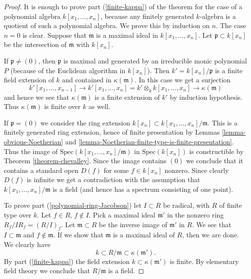 \begin{proof}
It is enough to prove part (\ref{finite-kappa}) of
the theorem for the case of a polynomial
algebra $k[x_1, \ldots, x_n]$, because any finitely generated
$k$-algebra is a quotient of such a polynomial algebra.
We prove this by induction on $n$. The case $n = 0$ is clear.
Suppose that $\mathfrak m$ is a maximal ideal in $k[x_1, \ldots, x_n]$.
Let $\mathfrak p \subset k[x_n]$ be the intersection
of $\mathfrak m$ with $k[x_n]$.

\medskip\noindent
If $\mathfrak p \not = (0)$,
then $\mathfrak p$ is maximal and generated by an irreducible
monic polynomial $P$ (because of the Euclidean algorithm
in $k[x_n]$). Then
$k' = k[x_n]/\mathfrak p$ is a finite field extension of $k$
and contained in $\kappa(\mathfrak m)$. In this case
we get a surjection
$$
k'[x_1, \ldots, x_{n-1}] 
\to
k'[x_1,\ldots,x_n] =
k' \otimes_k k[x_1,\ldots, x_n]
\longrightarrow
\kappa(\mathfrak m)
$$
and hence we see that $\kappa(\mathfrak m)$ is a finite
extension  of $k'$ by induction hypothesis. Thus $\kappa(\mathfrak m)$
is finite over $k$ as well.

\medskip\noindent
If $\mathfrak p = (0)$ we consider the ring
extension $k[x_n] \subset k[x_1, \ldots, x_n]/\mathfrak m$.
This is a finitely generated ring extension, hence
of finite presentation by
Lemmas \ref{lemma-obvious-Noetherian} and
\ref{lemma-Noetherian-finite-type-is-finite-presentation}.
Thus the image of $\text{Spec}(k[x_1, \ldots, x_n]/\mathfrak m)$
in $\text{Spec}(k[x_n])$ is constructible by
Theorem \ref{theorem-chevalley}. Since the image
contains $(0)$ we conclude that it contains a standard
open $D(f)$ for some $f\in k[x_n]$ nonzero. Since clearly
$D(f)$ is infinite we get a contradiction with the
assumption that $k[x_1,\ldots,x_n]/\mathfrak m$ is
a field (and hence has a spectrum consisting of one point).

\medskip\noindent
To prove part (\ref{polynomial-ring-Jacobson}) let
$I \subset R$ be radical, with $R$ of finite type over $k$.
Let $f \in R$, $f \not \in I$. Pick a maximal ideal $\mathfrak m'$
in the nonzero ring $R_f/IR_f = (R/I)_f$. Let $\mathfrak m \subset R$
be the inverse image of $\mathfrak m'$ in $R$. We see that
$I \subset \mathfrak m$
and $f \not \in \mathfrak m$. If we show that $\mathfrak m$ is a maximal
ideal of $R$, then we are done. We clearly have
$$
k \subset R/\mathfrak m \subset \kappa(\mathfrak m').
$$
By part (\ref{finite-kappa}) the field extension
$k \subset \kappa(\mathfrak m')$
is finite. By elementary field theory we conclude that $R/\mathfrak m$
is a field.
\end{proof}

